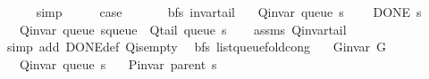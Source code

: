 \begin{isabellebody}
\ \ \ \ \isamarkupfalse%
\ simp\isanewline
\ \ \isamarkupfalse%
\ \isamarkupfalse%
\ {\isacharquery}{\kern0pt}case\isanewline
\ \ \ \ \isacommand{{\isachardot}{\kern0pt}}\isamarkupfalse%
\isanewline
{}\isamarkupfalse%
%
\endisatagproof
{\isafoldproof}%
%
\isadelimproof
\isanewline
%
\endisadelimproof
%
\isadeliminvisible
\isanewline
%
\endisadeliminvisible
%
\isataginvisible
{}\isamarkupfalse%
\ {\isacharparenleft}{\kern0pt}\ bfs{\isacharparenright}{\kern0pt}\ invar{\isacharunderscore}{\kern0pt}tail{\isacharcolon}{\kern0pt}\isanewline
\ \ \ {\isachardoublequoteopen}Q{\isacharunderscore}{\kern0pt}invar\ {\isacharparenleft}{\kern0pt}queue\ s{\isacharparenright}{\kern0pt}{\isachardoublequoteclose}\isanewline
\ \ \ {\isachardoublequoteopen}{\isasymnot}\ DONE\ s{\isachardoublequoteclose}\isanewline
\ \ \ {\isachardoublequoteopen}Q{\isacharunderscore}{\kern0pt}invar\ {\isacharparenleft}{\kern0pt}queue\ {\isacharparenleft}{\kern0pt}s{\isasymlparr}queue\ {\isacharcolon}{\kern0pt}{\isacharequal}{\kern0pt}\ Q{\isacharunderscore}{\kern0pt}tail\ {\isacharparenleft}{\kern0pt}queue\ s{\isacharparenright}{\kern0pt}{\isasymrparr}{\isacharparenright}{\kern0pt}{\isacharparenright}{\kern0pt}{\isachardoublequoteclose}%
\endisataginvisible
{\isafoldinvisible}%
%
\isadeliminvisible
\isanewline
%
\endisadeliminvisible
%
\isadelimproof
\ \ %
\endisadelimproof
%
\isatagproof
{}\isamarkupfalse%
\ assms\ Q{\isachardot}{\kern0pt}invar{\isacharunderscore}{\kern0pt}tail\isanewline
\ \ \isamarkupfalse%
\ {\isacharparenleft}{\kern0pt}simp\ add{\isacharcolon}{\kern0pt}\ DONE{\isacharunderscore}{\kern0pt}def\ Q{\isachardot}{\kern0pt}is{\isacharunderscore}{\kern0pt}empty{\isacharparenright}{\kern0pt}%
\endisatagproof
{\isafoldproof}%
%
\isadelimproof
\isanewline
%
\endisadelimproof
\isanewline
{}\isamarkupfalse%
\ {\isacharparenleft}{\kern0pt}\ bfs{\isacharparenright}{\kern0pt}\ list{\isacharunderscore}{\kern0pt}queue{\isacharunderscore}{\kern0pt}fold{\isacharunderscore}{\kern0pt}cong{\isacharunderscore}{\kern0pt}{}{\isacharcolon}{\kern0pt}\isanewline
\ \ \ {\isachardoublequoteopen}G{\isachardot}{\kern0pt}invar\ G{\isachardoublequoteclose}\isanewline
\ \ \ {\isachardoublequoteopen}Q{\isacharunderscore}{\kern0pt}invar\ {\isacharparenleft}{\kern0pt}queue\ s{\isacharparenright}{\kern0pt}{\isachardoublequoteclose}\isanewline
\ \ \ {\isachardoublequoteopen}P{\isacharunderscore}{\kern0pt}invar\ {\isacharparenleft}{\kern0pt}parent\ s{\isacharparenright}{\kern0pt}{\isachardoublequoteclose}\isanewline

\end{isabellebody}
